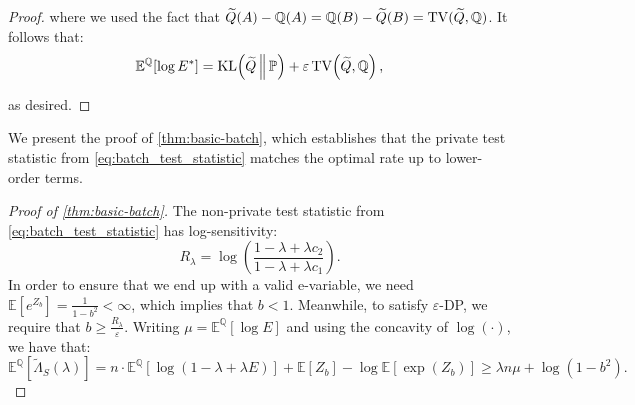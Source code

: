 \documentclass{article}
\DeclareMathOperator{\KLop}{KL}
\newcommand{\KL}[2]{%
  \mathchoice
    {\KLop\!\left(#1\,\middle\|\,#2\right)}%
    {\KLop(#1\,\Vert\,#2)}%
    {\KLop(#1\,\Vert\,#2)}%
    {\KLop(#1\,\Vert\,#2)}%
}
\DeclareMathOperator{\TVop}{TV}
\newcommand{\TV}[2]{
  \mathchoice
    {\TVop\!\left(#1,#2\right)}%
    {\TVop(#1,#2)}%
    {\TVop(#1,#2)}%
    {\TVop(#1,#2)}%
}
\newcommand{\Null}{\mathbb{P}}
\newcommand{\E}{\mathbb{E}}
\newcommand{\Alt}{\mathbb{Q}}
\newcommand{\eps}{\varepsilon}
\begin{document}
\begin{proof}
    where we used the fact that $\widetilde Q(A) - \Alt(A) = \Alt(B) - \widetilde Q(B) = \TV{\widetilde Q}{\Alt}$. It follows that:
    \begin{equation*}
        \E^\Alt[\log E^*] = \KL{\widetilde Q}{\Null} + \eps \TV{\widetilde Q}{\Alt},
    \end{equation*}

    as desired.
\end{proof}



\vspace{1cm}

We present the proof of \cref{thm:basic-batch}, which establishes that the private test statistic from \cref{eq:batch_test_statistic} matches the optimal rate up to lower-order terms.

\begin{proof}[Proof of \cref{thm:basic-batch}]
The non-private test statistic from \cref{eq:batch_test_statistic} has log-sensitivity:
    \begin{equation*}
        R_\lambda = \log \left( \frac{1-\lambda+\lambda c_2}{1-\lambda+\lambda c_1} \right).
    \end{equation*}
    In order to ensure that we end up with a valid e-variable, we need $\mathbb{E}[e^{Z_b}] = \frac{1}{1-b^2} < \infty$, which implies that $b < 1$. Meanwhile, to satisfy $\varepsilon$-DP, we require that $b \geq \frac{R_\lambda}{\varepsilon}$. Writing $\mu = \E^\Alt[\log E]$ and using the concavity of $\log(\cdot)$, we have that:
    \begin{equation*}
        \mathbb{E}^\Alt[\tilde \Lambda_S(\lambda)] = n \cdot\mathbb{E}^\Alt[\log(1-\lambda+\lambda E)] + \mathbb{E}[Z_b] - \log \mathbb{E}[\exp(Z_b)] \geq \lambda n \mu + \log (1-b^2).
    \end{equation*}


\end{proof}
\end{document}
